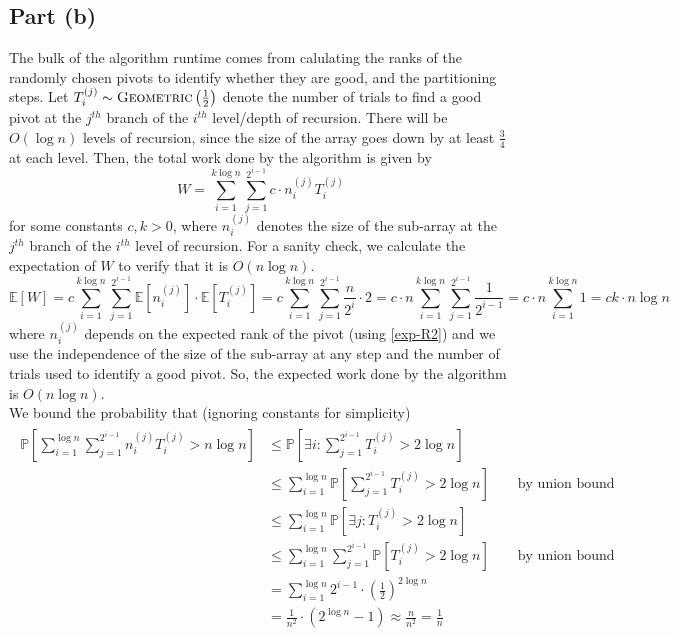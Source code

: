 \documentclass[9pt]{article}
\begin{document}
\subsection*{Part (b)}
The bulk of the algorithm runtime comes from calulating the ranks of the randomly chosen pivots
to identify whether they are good, and the partitioning steps. Let
$T_{i}^{(j)} \sim \textsc{Geometric}\left(\frac{1}{2}\right)$ denote the number of trials
to find a good pivot at the $j^{th}$ branch of the $i^{th}$ level/depth of recursion. There
will be $O(\log{n})$ levels of recursion, since the size of the array goes down by at least
$\frac{3}{4}$ at each level. Then, the total work done by the algorithm is given by
\begin{equation}
    W = \sum_{i=1}^{k\log{n}} \sum_{j=1}^{2^{i-1}} c \cdot n_{i}^{(j)} T_{i}^{(j)}
\end{equation}
for some constants $c, k > 0$, where $n_{i}^{(j)}$ denotes the size of the sub-array at the $j^{th}$ branch
of the $i^{th}$ level of recursion. For a sanity check, we calculate the expectation of $W$ to verify
that it is $O(n \log{n})$.
\begin{equation}
    \mathbb{E}\left[ W \right] = c \sum_{i=1}^{k\log{n}} \sum_{j=1}^{2^{i-1}}
    \mathbb{E}\left[ n_{i}^{(j)} \right] \cdot \mathbb{E}\left[ T_{i}^{(j)} \right]
    = c \sum_{i=1}^{k\log{n}} \sum_{j=1}^{2^{i-1}} \frac{n}{2^{i}} \cdot 2
    = c \cdot n \sum_{i=1}^{k \log{n}} \sum_{j=1}^{2^{i-1}} \frac{1}{2^{i-1}}
    = c \cdot n \sum_{i=1}^{k \log{n}} 1 = ck \cdot n \log{n}
\end{equation}
where $n_{i}^{(j)}$ depends on the expected rank of the pivot (using \eqref{exp-R2}) and
we use the independence of the size of the sub-array at any step and the number of trials used
to identify a good pivot. So, the expected work done by the algorithm is $O(n \log{n})$.
\pagebreak \\
We bound the probability that (ignoring constants for simplicity)
\begin{align}
    \begin{split}
        \mathbb{P}\left[ \sum_{i=1}^{\log{n}} \sum_{j=1}^{2^{i-1}} n_{i}^{(j)} T_{i}^{(j)} > n \log{n} \right]
        &\leq \mathbb{P}\left[ \exists i : \sum_{j=1}^{2^{i-1}} T_{i}^{(j)} > 2 \log{n} \right] \\
        &\leq \sum_{i=1}^{\log{n}} \mathbb{P}\left[ \sum_{j=1}^{2^{i-1}} T_{i}^{(j)} > 2 \log{n} \right] \qquad \text{by union bound} \\
        &\leq \sum_{i=1}^{\log{n}} \mathbb{P}\left[ \exists j : T_{i}^{(j)} > 2 \log{n} \right] \\
        &\leq \sum_{i=1}^{\log{n}} \sum_{j=1}^{2^{i-1}} \mathbb{P}\left[ T_{i}^{(j)} > 2 \log{n} \right] \qquad \text{by union bound} \\\
        &= \sum_{i=1}^{\log{n}} 2^{i-1} \cdot \left( \frac{1}{2} \right)^{2 \log{n}} \\
        &= \frac{1}{n^{2}} \cdot (2^{\log{n}} - 1) \approx \frac{n}{n^{2}} = \frac{1}{n}
    \end{split}
\end{align}
\end{document}
